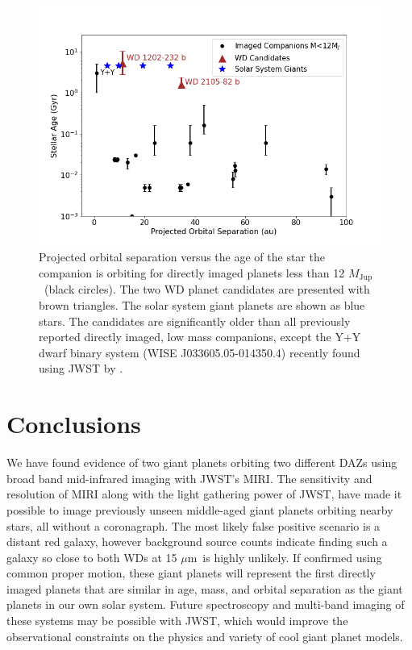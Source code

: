 \documentclass[twocolumn]{aastex631}
\newcommand{\mj}{\,$M_\mathrm{Jup}$}
\newcommand{\um}{\,$\mu$m}
\begin{document}
\begin{figure}
    \centering
    \includegraphics[width=1.05\linewidth]{compare_planet_ages.png}
    \caption{Projected orbital separation versus the age of the star the companion is orbiting for directly imaged planets less than 12\,\mj\ (black circles). The two WD planet candidates are presented with brown triangles. The solar system giant planets are shown as blue stars. The candidates are significantly older than all previously reported directly imaged, low mass companions, except the Y+Y dwarf binary system (WISE J033605.05-014350.4) recently found using JWST by \citet{Calissendorff2023}. }
    \label{fig:planets}
\end{figure}

 


\section{Conclusions}

We have found evidence of two giant planets orbiting two different DAZs using broad band mid-infrared imaging with JWST's MIRI. The sensitivity and resolution of MIRI along with the light gathering power of JWST, have made it possible to image previously unseen middle-aged giant planets orbiting nearby stars, all without a coronagraph. The most likely false positive scenario is a distant red galaxy, however background source counts indicate finding such a galaxy so close to both WDs at 15\,\um\ is highly unlikely. If confirmed using common proper motion, these giant planets will represent the first directly imaged planets that are similar in age, mass, and orbital separation as the giant planets in our own solar system.  Future spectroscopy and multi-band imaging of these systems may be possible with JWST, which would improve the observational constraints on the physics and variety of cool giant planet models.
\end{document}
